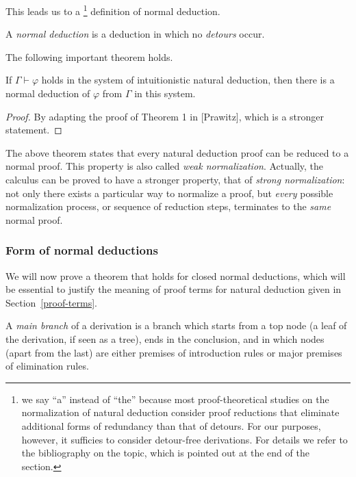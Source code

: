 This leads us to a \footnote{we say ``a'' instead of ``the'' because most
  proof-theoretical studies on the normalization of natural deduction consider
  proof reductions that eliminate additional forms of redundancy than that of
  detours. For our purposes, however, it sufficies to consider detour-free
  derivations. For details we refer to the bibliography on the topic, which is
  pointed out at the end of the section.} definition of normal deduction.

\begin{definition}
  A \emph{normal deduction} is a deduction in which no \emph{detours} occur.
\end{definition}

The following important theorem holds.

\begin{theorem}
  If $\Gamma \vdash \varphi$ holds in the system of intuitionistic natural
  deduction, then there is a normal deduction of $\varphi$ from $\Gamma$ in this
  system.
\end{theorem}
\begin{proof}
  By adapting the proof of Theorem 1 in [Prawitz], which is a stronger
  statement.
\end{proof}

The above theorem states that every natural deduction proof can be reduced to a
normal proof. This property is also called \emph{weak normalization}. Actually,
the calculus can be proved to have a stronger property, that of \emph{strong
  normalization}: not only there exists a particular way to normalize a proof,
but \emph{every} possible normalization process, or sequence of reduction steps,
terminates to the \emph{same} normal proof.

\subsubsection{Form of normal deductions}

We will now prove a theorem that holds for closed normal deductions, which will
be essential to justify the meaning of proof terms for natural deduction given
in Section~\ref{proof-terms}.

\begin{definition}
  A \emph{main branch} of a derivation is a branch which starts from a top node
  (a leaf of the derivation, if seen as a tree), ends in the conclusion, and in
  which nodes (apart from the last) are either premises of introduction rules or
  major premises of elimination rules.
\end{definition}

